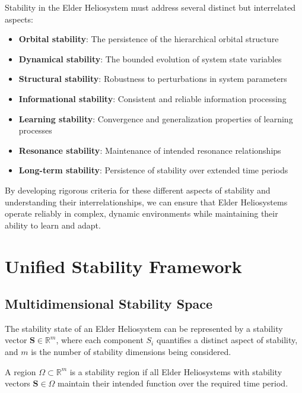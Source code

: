 Stability in the Elder Heliosystem must address several distinct but interrelated aspects:
\begin{itemize}
    \item \textbf{Orbital stability}: The persistence of the hierarchical orbital structure
    \item \textbf{Dynamical stability}: The bounded evolution of system state variables
    \item \textbf{Structural stability}: Robustness to perturbations in system parameters
    \item \textbf{Informational stability}: Consistent and reliable information processing
    \item \textbf{Learning stability}: Convergence and generalization properties of learning processes
    \item \textbf{Resonance stability}: Maintenance of intended resonance relationships
    \item \textbf{Long-term stability}: Persistence of stability over extended time periods
\end{itemize}

By developing rigorous criteria for these different aspects of stability and understanding their interrelationships, we can ensure that Elder Heliosystems operate reliably in complex, dynamic environments while maintaining their ability to learn and adapt.

\section{Unified Stability Framework}

\subsection{Multidimensional Stability Space}

\begin{definition}
The stability state of an Elder Heliosystem can be represented by a stability vector $\mathbf{S} \in \mathbb{R}^m$, where each component $S_i$ quantifies a distinct aspect of stability, and $m$ is the number of stability dimensions being considered.
\end{definition}

\begin{definition}
A region $\Omega \subset \mathbb{R}^m$ is a stability region if all Elder Heliosystems with stability vectors $\mathbf{S} \in \Omega$ maintain their intended function over the required time period.
\end{definition}

